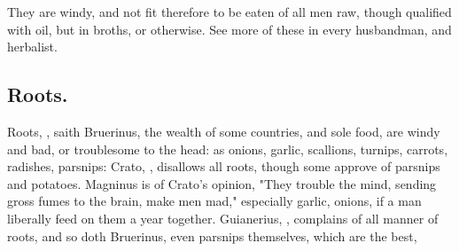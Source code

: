
They are windy, and not fit therefore to be eaten of all
men raw, though qualified with oil, but in broths, or otherwise. See more of
these in every husbandman, and herbalist.

\subsection{Roots.}
Roots, , saith Bruerinus, the wealth of
some countries, and sole food, are windy and bad, or troublesome to the head:
as onions, garlic, scallions, turnips, carrots, radishes, parsnips: Crato,
, disallows all roots, though
some approve of parsnips and potatoes.
Magninus is of Crato's opinion, "They
trouble the mind, sending gross fumes to the brain, make men mad," especially
garlic, onions, if a man liberally feed on them a year together. Guianerius,
, complains of all manner of roots, and
so doth Bruerinus, even parsnips themselves, which are the best,

